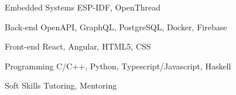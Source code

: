 

\begin{cvskills}

  \cvskill
    {Embedded Systems} %
    {ESP-IDF, OpenThread} %

  \cvskill
    {Back-end} %
    {OpenAPI, GraphQL, PostgreSQL, Docker, Firebase} %

  \cvskill
    {Front-end} %
    {React, Angular, HTML5, CSS} %

  \cvskill
    {Programming} %
    {C/C++, Python, Typescript/Javascript, Haskell} %

  \cvskill
    {Soft Skills} %
    {Tutoring, Mentoring} %

\end{cvskills}
